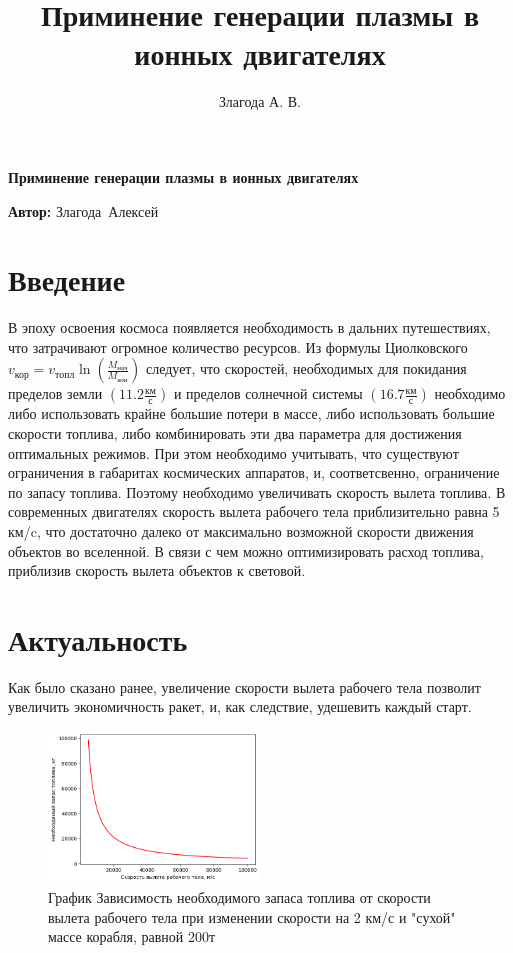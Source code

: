 \documentclass[a4paper,11pt]{article}
\author{Злагода А. В.}
\title{Приминение генерации плазмы в ионных двигателях}
\begin{document}
\begin{center}
\end{center}
\noindent\makebox[\linewidth]{\rule{\textwidth}{2pt}}
\begin{center}
	\Huge \bf Приминение генерации плазмы в ионных двигателях 
\end{center}

\hfill\Large
\vbox{%
\hfill%
\vbox{%
\hbox{\textbf{Автор:}}%
\hbox{Злагода Алексей}%
}%
} 

\section{\Large  Введение}

\indent
В эпоху освоения космоса появляется необходимость в дальних путешествиях, что затрачивают огромное количество ресурсов.
Из формулы Циолковского 
$v_\text{кор} = v_\text{топл} \ln(\frac{M_\text{нач}}{M_\text{кон}})$ 
следует, что скоростей, необходимых для покидания пределов земли 
$(11.2\frac{\text{км}}{\text{с}})$
 и пределов солнечной системы 
 $(16.7\frac{\text{км}}{\text{с}})$
 необходимо либо использовать крайне большие потери в массе, либо использовать большие скорости топлива, либо комбинировать эти два параметра для достижения оптимальных режимов.   
При этом необходимо учитывать, что существуют ограничения в габаритах космических аппаратов, и, соответсвенно, ограничение по запасу топлива. Поэтому необходимо увеличивать скорость вылета топлива. 
\newline
\indent
В современных двигателях скорость вылета рабочего тела приблизительно равна 5 км/c, что достаточно далеко от максимально возможной скорости движения объектов во вселенной. В связи с чем можно оптимизировать расход топлива, приблизив скорость вылета объектов к световой.
\section{\Large Актуальность}
Как было сказано ранее, увеличение скорости вылета рабочего тела позволит увеличить экономичность ракет, и, как следствие, удешевить каждый старт. 
\newpage
\begin{figure}[h!]
	\centering
	\includegraphics[width=0.5\textwidth]{"media/M_fuel_by_WTS.png"}
	\caption{График Зависимость необходимого запаса топлива от скорости вылета рабочего тела при изменении скорости на 2 км/с и "сухой" массе корабля, равной 200т}
\end{figure}
\end{document}
